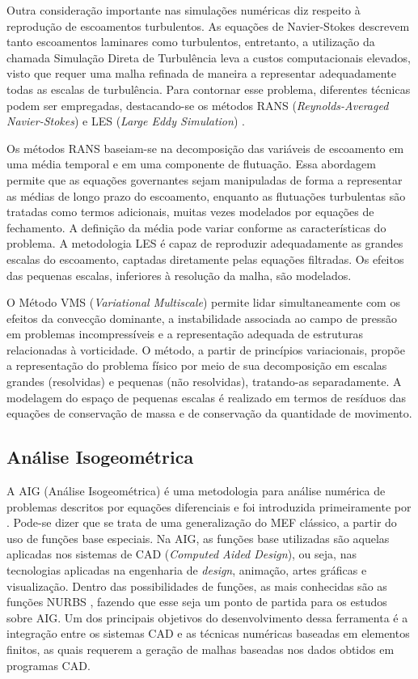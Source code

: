 Outra consideração importante nas simulações numéricas diz respeito à reprodução de escoamentos turbulentos. As equações de Navier-Stokes descrevem tanto escoamentos laminares como turbulentos, entretanto, a utilização da chamada Simulação Direta de Turbulência leva a custos computacionais elevados, visto que requer uma malha refinada de maneira a representar adequadamente todas as escalas de turbulência. Para contornar esse problema, diferentes técnicas podem ser empregadas, destacando-se os métodos RANS (\textit{Reynolds-Averaged Navier-Stokes})  \cite{Alfonsi2009,Speziale1991} e LES (\textit{Large Eddy Simulation}) \cite{Germano1991,LaunderS:1972,PIOMELLI1999,Wilcox:1993}.

Os métodos RANS baseiam-se na decomposição das variáveis de escoamento em uma média temporal e em uma componente de flutuação. Essa abordagem permite que as equações governantes sejam manipuladas de forma a representar as médias de longo prazo do escoamento, enquanto as flutuações turbulentas são tratadas como termos adicionais, muitas vezes modelados por equações de fechamento. A definição da média pode variar conforme as características do problema. A metodologia LES é capaz de reproduzir adequadamente as grandes escalas do escoamento, captadas diretamente pelas equações filtradas. Os efeitos das pequenas escalas, inferiores à resolução da malha, são modelados.

O Método VMS (\textit{Variational Multiscale}) \cite{BazilevsTT:2013a,Hughes:1995,Hughesetal:1998,Hughesetal:2001} permite lidar simultaneamente com os efeitos da convecção dominante, a instabilidade associada ao campo de pressão em problemas incompressíveis e a representação adequada de estruturas relacionadas à vorticidade. O método, a partir de princípios variacionais, propõe a representação do problema físico por meio de sua decomposição em escalas grandes (resolvidas) e pequenas (não resolvidas), tratando-as separadamente.  A modelagem do espaço de pequenas escalas é realizado em termos de resíduos das equações de conservação de massa e de conservação da quantidade de movimento. 

\subsection{Análise Isogeométrica}
\label{AIGsection}

A AIG (Análise Isogeométrica) é uma metodologia para análise numérica de problemas descritos por equações diferenciais e foi introduzida primeiramente por . Pode-se dizer que se trata de uma generalização do MEF clássico, a partir do uso de funções base especiais. Na AIG, as funções base utilizadas são aquelas aplicadas nos sistemas de CAD (\textit{Computed Aided Design}), ou seja, nas tecnologias aplicadas na engenharia de \textit{design}, animação, artes gráficas e visualização.  Dentro das possibilidades de funções, as mais conhecidas são as funções NURBS \cite{PiegT:1996}, fazendo que esse seja um ponto de partida para os estudos sobre AIG. Um dos principais objetivos do desenvolvimento dessa ferramenta é a integração entre os sistemas CAD e as técnicas numéricas baseadas em elementos finitos, as quais requerem a geração de malhas baseadas nos dados obtidos em programas CAD. 
		
